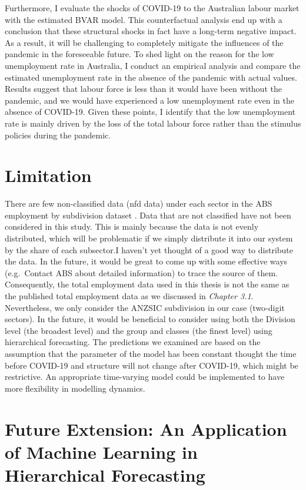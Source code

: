 \documentclass{monashthesis}
\begin{document}
Furthermore, I evaluate the shocks of COVID-19 to the Australian labour market with the estimated BVAR model. This counterfactual analysis end up with a conclusion that these structural shocks in fact have a long-term negative impact. As a result, it will be challenging to completely mitigate the influences of the pandemic in the foreseeable future. To shed light on the reason for the low unemployment rate in Australia, I conduct an empirical analysis and compare the estimated unemployment rate in the absence of the pandemic with actual values. Results suggest that labour force is less than it would have been without the pandemic, and we would have experienced a low unemployment rate even in the absence of COVID-19. Given these points, I identify that the low unemployment rate is mainly driven by the loss of the total labour force rather than the stimulus policies during the pandemic.

\hypertarget{limitation}{%
\section{Limitation}\label{limitation}}

There are few non-classified data (nfd data) under each sector in the ABS employment by subdivision dataset \autocite{ABS2022}. Data that are not classified have not been considered in this study. This is mainly because the data is not evenly distributed, which will be problematic if we simply distribute it into our system by the share of each subsector.I haven't yet thought of a good way to distribute the data. In the future, it would be great to come up with some effective ways (e.g.~Contact ABS about detailed information) to trace the source of them. Consequently, the total employment data used in this thesis is not the same as the published total employment data as we discussed in \emph{Chapter 3.1}. Nevertheless, we only consider the ANZSIC subdivision in our case (two-digit sectors). In the future, it would be beneficial to consider using both the Division level (the broadest level) and the group and classes (the finest level) using hierarchical forecasting. The predictions we examined are based on the assumption that the parameter of the model has been constant thought the time before COVID-19 and structure will not change after COVID-19, which might be restrictive. An appropriate time-varying model could be implemented to have more flexibility in modelling dynamics.

\hypertarget{future-extension-an-application-of-machine-learning-in-hierarchical-forecasting}{%
\section{Future Extension: An Application of Machine Learning in Hierarchical Forecasting}\label{future-extension-an-application-of-machine-learning-in-hierarchical-forecasting}}
\end{document}
